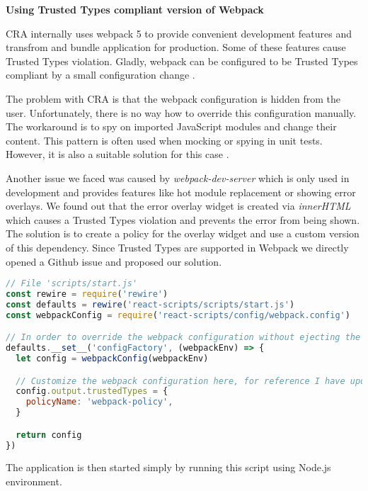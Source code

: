\medskip
\begin{flushleft}\textbf {Using Trusted Types compliant version of Webpack}\end{flushleft}
\medskip

CRA internally uses webpack 5 to provide convenient development features and transfrom and bundle
application for production. Some of these features cause Trusted Types violation. Gladly, webpack
can be configured to be Trusted Types compliant by a small configuration change
\cite{webpack_tt_config}.

The problem with CRA is that the webpack configuration is hidden from the user. Unfortunately, there
is no way how to override this configuration manually. The workaround is to spy on imported
JavaScript modules and change their content. This pattern is often used when mocking or spying in
unit tests. However, it is also a suitable solution for this case \cite{cra_modify_webpack_config}.

Another issue we faced was caused by \emph{webpack-dev-server} which is only used in development and
provides features like hot module replacement or showing error overlays. We found out that the error
overlay widget is created via \emph{innerHTML} which causes a Trusted Types violation and prevents
the error from being shown. The solution is to create a policy for the overlay widget and use a
custom version of this dependency. Since Trusted Types are supported in Webpack we directly opened a
Github issue \cite{tt_webpack_dev_server:issue} and proposed our solution.

\bigskip
\begin{lstlisting}[language=JavaScript, caption=Script to start React application with Trusted Types enabled in webpack]
// File 'scripts/start.js'
const rewire = require('rewire')
const defaults = rewire('react-scripts/scripts/start.js')
const webpackConfig = require('react-scripts/config/webpack.config')

// In order to override the webpack configuration without ejecting the create-react-app
defaults.__set__('configFactory', (webpackEnv) => {
  let config = webpackConfig(webpackEnv)

  // Customize the webpack configuration here, for reference I have updated webpack externals field
  config.output.trustedTypes = {
    policyName: 'webpack-policy',
  }

  return config
})
\end{lstlisting}

The application is then started simply by running this script using Node.js environment.

